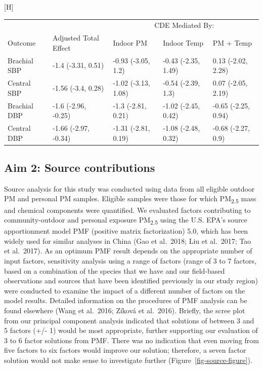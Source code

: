 \documentclass[
  letterpaper,
  DIV=11,
  numbers=noendperiod]{scrartcl}
\makeatletter
\renewenvironment{table}%
  {\renewcommand\familydefault\sfdefault
   \@float{table}}
  {\end@float}
\makeatother
\begin{document}
\hypertarget{tbl-bp-med}{}
\begin{table}[H]
\caption{\label{tbl-bp-med}Controlled direct effects for the CBHP policy }\tabularnewline

\centering
\begin{tabular}{lllll}
\toprule
\multicolumn{2}{c}{ } & \multicolumn{3}{c}{CDE Mediated By:} \\
\cmidrule(l{3pt}r{3pt}){3-5}
Outcome & Adjusted Total Effect & Indoor PM & Indoor Temp & PM + Temp\\
\midrule
Brachial SBP & -1.4 (-3.31, 0.51) & -0.93 (-3.05, 1.2) & -0.43 (-2.35, 1.49) & 0.13 (-2.02, 2.28)\\
Central SBP & -1.56 (-3.4, 0.28) & -1.02 (-3.13, 1.08) & -0.54 (-2.39, 1.3) & 0.07 (-2.05, 2.19)\\
Brachial DBP & -1.6 (-2.96, -0.25) & -1.3 (-2.81, 0.21) & -1.02 (-2.45, 0.42) & -0.65 (-2.25, 0.94)\\
Central DBP & -1.66 (-2.97, -0.34) & -1.31 (-2.81, 0.19) & -1.08 (-2.48, 0.32) & -0.68 (-2.27, 0.9)\\
\bottomrule
\end{tabular}
\end{table}

\hypertarget{aim-2-source-contributions}{%
\subsection{Aim 2: Source
contributions}\label{aim-2-source-contributions}}

Source analysis for this study was conducted using data from all
eligible outdoor PM and personal PM samples. Eligible samples were those
for which PM\textsubscript{2.5} mass and chemical components were
quantified. We evaluated factors contributing to community-outdoor and
personal exposure PM\textsubscript{2.5} using the U.S. EPA's source
apportionment model PMF (positive matrix factorization) 5.0, which has
been widely used for similar analyses in China (Gao et al.~2018; Liu et
al.~2017; Tao et al.~2017). As an optimum PMF result depends on the
appropriate number of input factors, sensitivity analysis using a range
of factors (range of 3 to 7 factors, based on a combination of the
species that we have and our field-based observations and sources that
have been identified previously in our study region) were conducted to
examine the impact of a different number of factors on the model
results. Detailed information on the procedures of PMF analysis can be
found elsewhere (Wang et al.~2016; Zíková et al.~2016). Briefly, the
scree plot from our principal component analysis indicated that
solutions of between 3 and 5 factors (+/- 1) would be most appropriate,
further supporting our evaluation of 3 to 6 factor solutions from PMF.
There was no indication that even moving from five factors to six
factors would improve our solution; therefore, a seven factor solution
would not make sense to investigate further
(Figure~\ref{fig-source-figure}).
\end{document}
